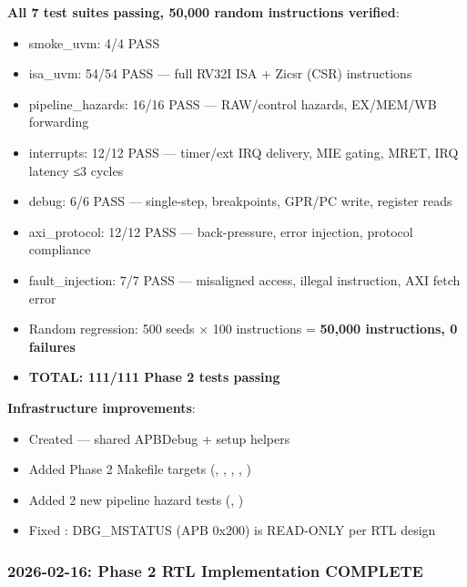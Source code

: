 \begin{record}

\textbf{All 7 test suites passing, 50,000 random instructions verified}:

\begin{itemize}
\tightlist
\item
  \ok{} smoke\_\allowbreak{}uvm: 4/4 PASS
\item
  \ok{} isa\_uvm: 54/54 PASS --- full RV32I ISA + Zicsr (CSR)
  instructions
\item
  \ok{} pipeline\_\allowbreak{}hazards: 16/16 PASS ---
  RAW/\allowbreak{}control hazards, EX/MEM/WB forwarding
\item
  \ok{} interrupts: 12/12 PASS --- timer/ext IRQ delivery, MIE gating,
  MRET, IRQ latency ≤3 cycles
\item
  \ok{} debug: 6/6 PASS --- single-step, breakpoints, GPR/PC write,
  register reads
\item
  \ok{} axi\_\allowbreak{}protocol: 12/12 PASS --- back-pressure, error
  injection, protocol compliance
\item
  \ok{} fault\_\allowbreak{}injection: 7/7 PASS --- misaligned access,
  illegal instruction, AXI fetch error
\item
  \ok{} Random regression: 500 seeds × 100 instructions = \textbf{50,000
  instructions, 0 failures}
\item
  \textbf{TOTAL: 111/111 Phase 2 tests passing}
\end{itemize}

\textbf{Infrastructure improvements}:

\begin{itemize}
\tightlist
\item
  Created  --- shared APBDebug +
  setup helpers
\item
  Added Phase 2 Makefile targets (,
  , , ,
  )
\item
  Added 2 new pipeline hazard tests (,
  )
\item
  Fixed : DBG\_\allowbreak{}MSTATUS (APB
  0x200) is READ-ONLY per RTL design
\end{itemize}

\end{record}

\subsubsection{\texorpdfstring{2026-02-16: Phase 2 RTL Implementation
COMPLETE \ok{}}{2026-02-16: Phase 2 RTL Implementation COMPLETE }}\label{cr:status:phase-status:2026-02-16-phase-2-rtl-implementation-complete-tada}

